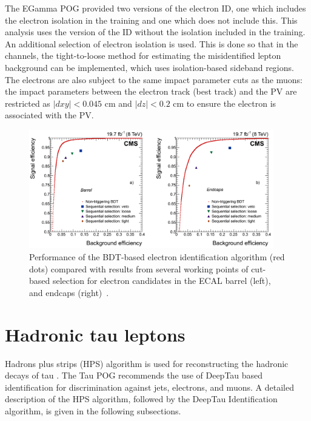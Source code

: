 The EGamma POG provided two versions of the electron ID, one which includes the electron isolation in the training and one which does not include this. This analysis uses the version of the ID without the isolation included in the training. An additional selection of electron isolation is used. This is done so that in the \Hehad channels, the tight-to-loose method for estimating the misidentified lepton background can be implemented, which uses isolation-based sideband regions. The electrons are also subject to the same impact parameter cuts as the muons: the impact parameters between the electron track (best track) and the PV are restricted as $|dxy| < 0.045$ cm and $|dz| < 0.2$ cm to ensure the electron is associated with the PV.

\begin{figure}[!htpb]
\centering
\captionsetup{width=0.95\textwidth,justification=centering}
\includegraphics[width=0.95\textwidth]{plots/chapter4/elec_eff.png}
\caption{Performance of the BDT-based electron identification algorithm (red dots) compared with results from several working points of cut-based selection for electron candidates in the ECAL barrel (left), and endcaps (right)~\cite{Khachatryan:2015hwa}.}
 \label{fig:elec_eff}
\end{figure}

\section{Hadronic tau leptons}
\label{tau_recon}
Hadrons plus strips (HPS) algorithm is used for reconstructing the hadronic decays of tau \cite{Sirunyan:2018pgf}. The Tau POG recommends the use of DeepTau based identification for discrimination against jets, electrons, and muons. A detailed description of the HPS algorithm, followed by the DeepTau Identification algorithm, is given in the following subsections.

